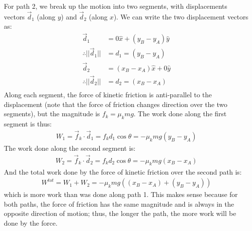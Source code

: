 \begin{example}
For path 2, we break up the motion into two segments, with displacements vectors $\vec d_1$ (along $y$) and $\vec d_2$ (along $x$). We can write the two displacement vectors as:
\begin{align*}
\vec d_1 &= 0\hat x + (y_B-y_A) \hat y\\
\therefore ||\vec d_1||&=d_1=(y_B-y_A)\\
\vec d_2 &= (x_B-x_A)\hat x + 0 \hat y\\
\therefore ||\vec d_2||&=d_2=(x_B-x_A)\\
\end{align*}
Along each segment, the force of kinetic friction is anti-parallel to the displacement (note that the force of friction changes direction over the two segments), but the magnitude is $f_k=\mu_kmg$. The work done along the first segment is thus:
\begin{align*}
W_1 = \vec f_k \cdot \vec d_1 = f_k d_1 \cos\theta = -\mu_k mg(y_B-y_A)
\end{align*}
The work done along the second segment is:
\begin{align*}
W_2 = \vec f_k \cdot \vec d_2 = f_k d_2 \cos\theta = -\mu_k mg(x_B-x_A)
\end{align*}
And the total work done by the force of kinetic friction over the second path is:
\begin{align*}
W^{tot} = W_1 + W_2 = -\mu_k mg \left((x_B-x_A) + (y_B-y_A)\right)
\end{align*}
which is more work than was done along path 1. This makes sense because for both paths, the force of friction has the same magnitude and is always in the opposite direction of motion; thus, the longer the path, the more work will be done by the force.
\end{example}
\vspace{-0.25cm}
